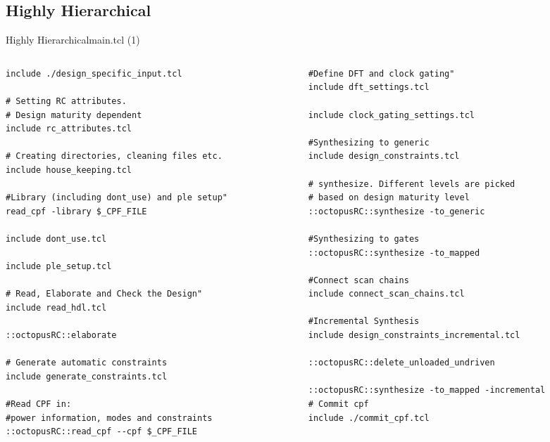 \documentclass{beamer}
\begin{document}
\subsection{Highly Hierarchical}
\begin{frame}{Highly Hierarchical}{main.tcl (1)}
\begin{columns}
\begin{column}{0.5\textwidth}
\tiny
\begin{verbatim}	
include ./design_specific_input.tcl

# Setting RC attributes.
# Design maturity dependent
include rc_attributes.tcl

# Creating directories, cleaning files etc.
include house_keeping.tcl

#Library (including dont_use) and ple setup"
read_cpf -library $_CPF_FILE

include dont_use.tcl

include ple_setup.tcl

# Read, Elaborate and Check the Design"
include read_hdl.tcl

::octopusRC::elaborate

# Generate automatic constraints
include generate_constraints.tcl

#Read CPF in: 
#power information, modes and constraints
::octopusRC::read_cpf --cpf $_CPF_FILE

\end{verbatim}
\end{column}

\begin{column}{0.5\textwidth}
\tiny
\begin{verbatim}
#Define DFT and clock gating"
include dft_settings.tcl

include clock_gating_settings.tcl

#Synthesizing to generic
include design_constraints.tcl

# synthesize. Different levels are picked 
# based on design maturity level
::octopusRC::synthesize -to_generic

#Synthesizing to gates
::octopusRC::synthesize -to_mapped

#Connect scan chains
include connect_scan_chains.tcl

#Incremental Synthesis
include design_constraints_incremental.tcl

::octopusRC::delete_unloaded_undriven 

::octopusRC::synthesize -to_mapped -incremental
# Commit cpf
include ./commit_cpf.tcl
\end{verbatim}

\end{column}
\end{columns}
\end{frame}
\end{document}
